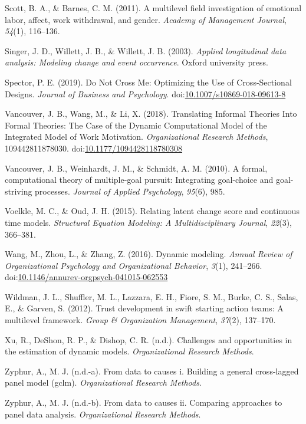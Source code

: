 \documentclass[english,,man]{apa6}
\theoremstyle{definition}
\theoremstyle{definition}
\theoremstyle{definition}
\theoremstyle{remark}
\begin{document}
\leavevmode\hypertarget{ref-scott_multilevel_2011}{}%
Scott, B. A., \& Barnes, C. M. (2011). A multilevel field investigation
of emotional labor, affect, work withdrawal, and gender. \emph{Academy
of Management Journal}, \emph{54}(1), 116--136.

\leavevmode\hypertarget{ref-singer_applied_2003}{}%
Singer, J. D., Willett, J. B., \& Willett, J. B. (2003). \emph{Applied
longitudinal data analysis: Modeling change and event occurrence}.
Oxford university press.

\leavevmode\hypertarget{ref-spector_not_2019}{}%
Spector, P. E. (2019). Do Not Cross Me: Optimizing the Use of
Cross-Sectional Designs. \emph{Journal of Business and Psychology}.
doi:\href{https://doi.org/10.1007/s10869-018-09613-8}{10.1007/s10869-018-09613-8}

\leavevmode\hypertarget{ref-vancouver_translating_2018}{}%
Vancouver, J. B., Wang, M., \& Li, X. (2018). Translating Informal
Theories Into Formal Theories: The Case of the Dynamic Computational
Model of the Integrated Model of Work Motivation. \emph{Organizational
Research Methods}, 109442811878030.
doi:\href{https://doi.org/10.1177/1094428118780308}{10.1177/1094428118780308}

\leavevmode\hypertarget{ref-vancouver2010formal}{}%
Vancouver, J. B., Weinhardt, J. M., \& Schmidt, A. M. (2010). A formal,
computational theory of multiple-goal pursuit: Integrating goal-choice
and goal-striving processes. \emph{Journal of Applied Psychology},
\emph{95}(6), 985.

\leavevmode\hypertarget{ref-voelkle2015relating}{}%
Voelkle, M. C., \& Oud, J. H. (2015). Relating latent change score and
continuous time models. \emph{Structural Equation Modeling: A
Multidisciplinary Journal}, \emph{22}(3), 366--381.

\leavevmode\hypertarget{ref-Wang2016}{}%
Wang, M., Zhou, L., \& Zhang, Z. (2016). Dynamic modeling. \emph{Annual
Review of Organizational Psychology and Organizational Behavior},
\emph{3}(1), 241--266.
doi:\href{https://doi.org/10.1146/annurev-orgpsych-041015-062553}{10.1146/annurev-orgpsych-041015-062553}

\leavevmode\hypertarget{ref-wildman2012trust}{}%
Wildman, J. L., Shuffler, M. L., Lazzara, E. H., Fiore, S. M., Burke, C.
S., Salas, E., \& Garven, S. (2012). Trust development in swift starting
action teams: A multilevel framework. \emph{Group \& Organization
Management}, \emph{37}(2), 137--170.

\leavevmode\hypertarget{ref-xu_deshon_dishop}{}%
Xu, R., DeShon, R. P., \& Dishop, C. R. (n.d.). Challenges and
opportunities in the estimation of dynamic models. \emph{Organizational
Research Methods}.

\leavevmode\hypertarget{ref-zyphura}{}%
Zyphur, A., M. J. (n.d.-a). From data to causes i. Building a general
cross-lagged panel model (gclm). \emph{Organizational Research Methods}.

\leavevmode\hypertarget{ref-zyphurb}{}%
Zyphur, A., M. J. (n.d.-b). From data to causes ii. Comparing approaches
to panel data analysis. \emph{Organizational Research Methods}.
\end{document}
